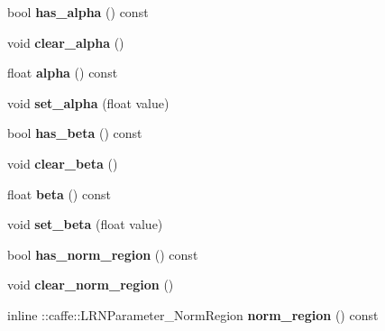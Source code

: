 \begin{DoxyCompactItemize}
bool {\bfseries has\+\_\+alpha} () const
\item 
\mbox{\label{classcaffe_1_1_l_r_n_parameter_adc42dc97fd64f06e49b74efccc198c94}} 
void {\bfseries clear\+\_\+alpha} ()
\item 
\mbox{\label{classcaffe_1_1_l_r_n_parameter_ac2cd05bec96df4390651fb4d421a787e}} 
float {\bfseries alpha} () const
\item 
\mbox{\label{classcaffe_1_1_l_r_n_parameter_aaffba41d94304f44381dbd7237d12d4b}} 
void {\bfseries set\+\_\+alpha} (float value)
\item 
\mbox{\label{classcaffe_1_1_l_r_n_parameter_af594f68c40332bf41ee5291e1fea9afe}} 
bool {\bfseries has\+\_\+beta} () const
\item 
\mbox{\label{classcaffe_1_1_l_r_n_parameter_aec1b14fce722dccf12d5630c13769550}} 
void {\bfseries clear\+\_\+beta} ()
\item 
\mbox{\label{classcaffe_1_1_l_r_n_parameter_a8ff89750cd0a0774085b40e9dfae1880}} 
float {\bfseries beta} () const
\item 
\mbox{\label{classcaffe_1_1_l_r_n_parameter_abcf127ad5d4fd5641b629a63e798e795}} 
void {\bfseries set\+\_\+beta} (float value)
\item 
\mbox{\label{classcaffe_1_1_l_r_n_parameter_ac7f3b6e8a687707d73843758fc86de2c}} 
bool {\bfseries has\+\_\+norm\+\_\+region} () const
\item 
\mbox{\label{classcaffe_1_1_l_r_n_parameter_af460ac5bb4e5349b480dae7431ca15c8}} 
void {\bfseries clear\+\_\+norm\+\_\+region} ()
\item 
\mbox{\label{classcaffe_1_1_l_r_n_parameter_a1174e0c3ec73ed04f30c36b11b099da5}} 
inline \+::caffe\+::\+L\+R\+N\+Parameter\+\_\+\+Norm\+Region {\bfseries norm\+\_\+region} () const
\item 

\end{DoxyCompactItemize}
